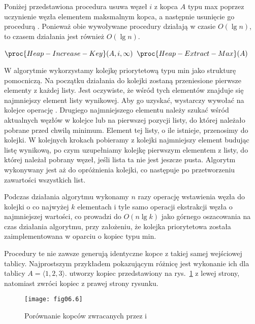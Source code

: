 \exercise %
Poniżej przedstawiona procedura  usuwa węzeł $i$ z  kopca $A$ typu max poprzez uczynienie węzła elementem maksmalnym kopca, a następnie usunięcie go procedurą . Ponieważ obie wywoływane procedury działają w czasie $O(\lg n)$, to czasem działania  jest również $O(\lg n)$.
\begin{codebox}
\li	$\proc{Heap-Increase-Key}(A,i,\infty)$
\li	$\proc{Heap-Extract-Max}(A)$
\end{codebox}

\exercise %
W algorytmie wykorzystamy kolejkę priorytetową typu min jako strukturę pomocniczą. Na początku działania do kolejki zostaną przeniesione pierwsze elementy z każdej listy. Jest oczywiste, że wśród tych elementów znajduje się najmniejszy element listy wynikowej. Aby go uzyskać, wystarczy wywołać na kolejce operację . Drugiego najmniejszego elementu należy szukać wśród aktualnych węzłów w kolejce lub na pierwszej pozycji listy, do której należało pobrane przed chwilą minimum. Element tej listy, o ile istnieje, przenosimy do kolejki. W kolejnych krokach pobieramy z kolejki najmniejszy element budując listę wynikową, po czym uzupełniamy kolejkę pierwszym elementem z listy, do której należał pobrany węzeł, jeśli lista ta nie jest jeszcze pusta. Algorytm wykonywany jest aż do opróżnienia kolejki, co następuje po przetworzeniu zawartości wszystkich list.

Podczas działania algorytmu wykonamy $n$ razy operację wstawienia węzła do kolejki o co najwyżej $k$ elementach i tyle samo operacji ekstrakcji węzła o najmniejszej wartości, co prowadzi do $O(n\lg k)$ jako górnego oszacowania na czas działania algorytmu, przy założeniu, że kolejka priorytetowa została zaimplementowana w oparciu o kopiec typu min.

\problems


\subproblem %
Procedury te nie zawsze generują identyczne kopce z takiej samej wejściowej tablicy. Najprostszym przykładem pokazującym różnicę jest wykonanie ich dla tablicy $A=\langle 1,2,3\rangle$.  utworzy kopiec przedstawiony na rys.~\ref{fig:6-1(a)} z lewej strony, natomiast  zwróci kopiec z prawej strony rysunku.
\begin{figure}[!h]
	\begin{center}
		\texttt{[image: fig06.6]}
	\end{center}
	\caption{Porównanie kopców zwracanych przez  i } \label{fig:6-1(a)}
\end{figure}

